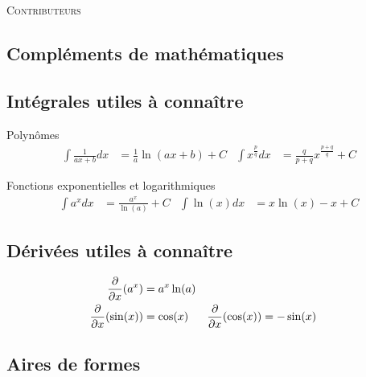 \documentclass[10pt, french]{article}
\begin{document}
\begin{center}
	\textsc{\Large Contributeurs}\\[0.5cm] 
\end{center}


\newpage

\begin{multicols*}{2}

\section*{Compléments de mathématiques}

\subsection*{Intégrales utiles à connaître}
\begin{conceptgen}{Polynômes}
\begin{align*}
	\int \frac{1}{ax + b} dx 
	&=	\frac{1}{a} \ln(ax + b) + C	&
	\int x^{\frac{p}{q}}dx
	&=	\frac{q}{p + q} x^{\frac{p + q}{q}} + C	
\end{align*}
\end{conceptgen}

\begin{conceptgen}{Fonctions exponentielles et logarithmiques}
\begin{align*}
	\int a^{x} dx 
	&=	\frac{a^{x}}{\ln(a)} + C	&
	\int \ln(x) dx 
	&=	x \ln(x) - x + C	
\end{align*}
\end{conceptgen}

\subsection*{Dérivées utiles à connaître}

\begin{align*}
	\frac{\partial}{\partial x}(a^{x})
	&=	a^{x}\ln(a)	\\
	\frac{\partial}{\partial x}(\sin(x))
	&=	\cos(x)	&
	\frac{\partial}{\partial x}(\cos(x))
	&=	-\sin(x)	\\	
\end{align*}

\subsection*{Aires de formes}

\begin{center}


\end{center}
\end{multicols*}
\end{document}
